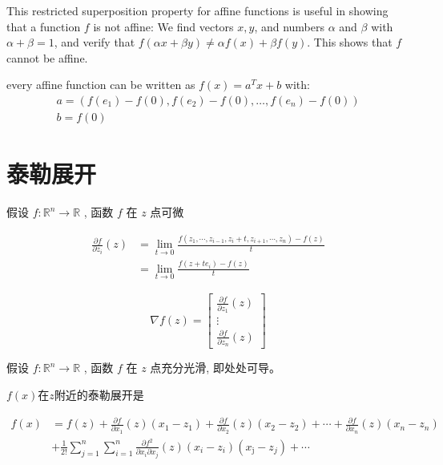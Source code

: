 \begin{corollary}
    This restricted superposition property for affine functions is useful in showing that a function $ f $ is not affine: We find vectors $ x, y $, and numbers $ \alpha $ and $ \beta $ with $ \alpha+\beta=1 $, and verify that $ f(\alpha x+\beta y) \neq \alpha f(x)+\beta f(y) . $ This shows that $ f $ cannot be affine.
\end{corollary}

\begin{theorem}
    every affine function can be written as $ f(x)=a^{T} x+b $ with:
$$
\begin{array}{l}
a=\left(f\left(e_{1}\right)-f(0), f\left(e_{2}\right)-f(0), \ldots, f\left(e_{n}\right)-f(0)\right) \\
b=f(0)
\end{array}
$$

\end{theorem}


\section{泰勒展开}

\begin{definition}[函数$f$第$i$个分量的一阶偏导数]
    假设 $ f: \mathbb{R}^{n} \rightarrow \mathbb{R} $ , 函数 $ f $ 在 $ z $ 点可微

    $$ \begin{aligned} \frac{\partial f}{\partial z_{i}}(z) &=\lim _{t \rightarrow 0} \frac{f\left(z_{1}, \cdots, z_{i-1}, z_{i}+t, z_{i+1}, \cdots, z_{n}\right)-f(z)}{t} \\ &=\lim _{t \rightarrow 0} \frac{f\left(z+t e_{i}\right)-f(z)}{t} \end{aligned} $$
\end{definition}

\begin{definition}[$f$在点$z$的梯度]
    $$ \nabla f(z)=\left[\begin{array}{c}\frac{\partial f}{\partial z_{1}}(z) \\ \vdots \\ \frac{\partial f}{\partial z_{n}}(z)\end{array}\right] $$
\end{definition}

\begin{definition}
    假设 $ f: \mathbb{R}^{n} \rightarrow \mathbb{R} $ , 函数 $ f $ 在 $ z $ 点充分光滑, 即处处可导。

    $f(x)$在$z$附近的泰勒展开是

    $$\begin{aligned} f(x)&=f(z)+\frac{\partial f}{\partial x_{1}}(z)\left(x_{1}-z_{1}\right)+\frac{\partial f}{\partial x_{2}}(z)\left(x_{2}-z_{2}\right)+\cdots+\frac{\partial f}{\partial x_{n}}(z)\left(x_{n}-z_{n}\right) 
    \\ & +\frac{1}{2 !} \sum_{j=1}^{n} \sum_{i=1}^{n} \frac{\partial f^{2}}{\partial x_{i} \partial x_{j}}(z)\left(x_{i}-z_{i}\right)\left(x_{\mathrm{j}}-z_{j}\right)+\cdots \end{aligned}$$
\end{definition}


